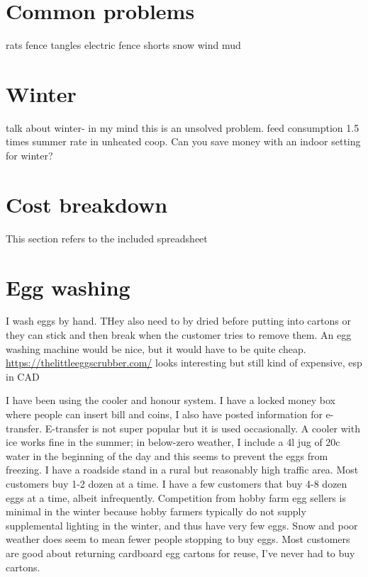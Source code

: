 \documentclass [11pt]{article}
\begin{document}
\section{Common problems }
rats
fence tangles
electric fence shorts 
snow 
wind 
mud 

\section{Winter}
talk about winter- in my mind this is an unsolved problem. feed consumption 1.5 times summer rate in unheated coop. Can you save money with an indoor setting for winter? 

\section{Cost breakdown}
This section refers to the included spreadsheet 

\section{ Egg washing}
I wash eggs by hand. THey also need to by dried before putting into cartons or they can stick and then break when the customer tries to remove them. An egg washing machine would be nice, but it would have to be quite cheap. 
\url{https://thelittleeggscrubber.com/} looks interesting but still kind of expensive, esp in CAD

I have been using the cooler and honour system. I have a locked money box where people can insert bill and coins, I also have posted information for e-transfer. E-transfer is not super popular but it is used occasionally. A cooler with ice works fine in the summer; in below-zero weather, I include a 4l jug of 20c water in the beginning of the day and this seems to prevent the eggs from freezing. I have a roadside stand in a rural but reasonably high traffic area. Most customers buy 1-2 dozen at a time. I have a few customers that buy 4-8 dozen eggs at a time, albeit infrequently. Competition from hobby farm egg sellers is minimal in the winter because hobby farmers typically do not supply supplemental lighting in the winter, and thus have very few eggs. Snow and poor weather does seem to mean fewer people stopping to buy eggs. Most customers are good about returning cardboard egg cartons for reuse, I've never had to buy cartons. 








\end{document}
